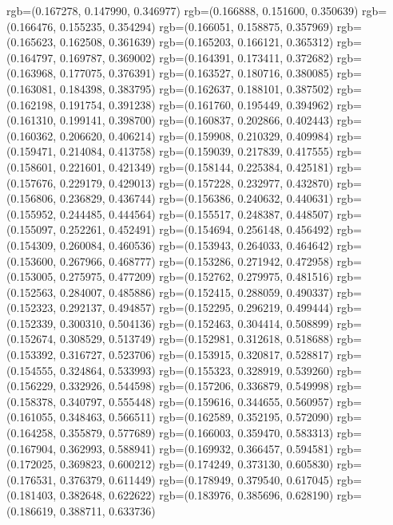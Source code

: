 {{{					rgb=(0.167278, 0.147990, 0.346977)
					rgb=(0.166888, 0.151600, 0.350639)
					rgb=(0.166476, 0.155235, 0.354294)
					rgb=(0.166051, 0.158875, 0.357969)
					rgb=(0.165623, 0.162508, 0.361639)
					rgb=(0.165203, 0.166121, 0.365312)
					rgb=(0.164797, 0.169787, 0.369002)
					rgb=(0.164391, 0.173411, 0.372682)
					rgb=(0.163968, 0.177075, 0.376391)
					rgb=(0.163527, 0.180716, 0.380085)
					rgb=(0.163081, 0.184398, 0.383795)
					rgb=(0.162637, 0.188101, 0.387502)
					rgb=(0.162198, 0.191754, 0.391238)
					rgb=(0.161760, 0.195449, 0.394962)
					rgb=(0.161310, 0.199141, 0.398700)
					rgb=(0.160837, 0.202866, 0.402443)
					rgb=(0.160362, 0.206620, 0.406214)
					rgb=(0.159908, 0.210329, 0.409984)
					rgb=(0.159471, 0.214084, 0.413758)
					rgb=(0.159039, 0.217839, 0.417555)
					rgb=(0.158601, 0.221601, 0.421349)
					rgb=(0.158144, 0.225384, 0.425181)
					rgb=(0.157676, 0.229179, 0.429013)
					rgb=(0.157228, 0.232977, 0.432870)
					rgb=(0.156806, 0.236829, 0.436744)
					rgb=(0.156386, 0.240632, 0.440631)
					rgb=(0.155952, 0.244485, 0.444564)
					rgb=(0.155517, 0.248387, 0.448507)
					rgb=(0.155097, 0.252261, 0.452491)
					rgb=(0.154694, 0.256148, 0.456492)
					rgb=(0.154309, 0.260084, 0.460536)
					rgb=(0.153943, 0.264033, 0.464642)
					rgb=(0.153600, 0.267966, 0.468777)
					rgb=(0.153286, 0.271942, 0.472958)
					rgb=(0.153005, 0.275975, 0.477209)
					rgb=(0.152762, 0.279975, 0.481516)
					rgb=(0.152563, 0.284007, 0.485886)
					rgb=(0.152415, 0.288059, 0.490337)
					rgb=(0.152323, 0.292137, 0.494857)
					rgb=(0.152295, 0.296219, 0.499444)
					rgb=(0.152339, 0.300310, 0.504136)
					rgb=(0.152463, 0.304414, 0.508899)
					rgb=(0.152674, 0.308529, 0.513749)
					rgb=(0.152981, 0.312618, 0.518688)
					rgb=(0.153392, 0.316727, 0.523706)
					rgb=(0.153915, 0.320817, 0.528817)
					rgb=(0.154555, 0.324864, 0.533993)
					rgb=(0.155323, 0.328919, 0.539260)
					rgb=(0.156229, 0.332926, 0.544598)
					rgb=(0.157206, 0.336879, 0.549998)
					rgb=(0.158378, 0.340797, 0.555448)
					rgb=(0.159616, 0.344655, 0.560957)
					rgb=(0.161055, 0.348463, 0.566511)
					rgb=(0.162589, 0.352195, 0.572090)
					rgb=(0.164258, 0.355879, 0.577689)
					rgb=(0.166003, 0.359470, 0.583313)
					rgb=(0.167904, 0.362993, 0.588941)
					rgb=(0.169932, 0.366457, 0.594581)
					rgb=(0.172025, 0.369823, 0.600212)
					rgb=(0.174249, 0.373130, 0.605830)
					rgb=(0.176531, 0.376379, 0.611449)
					rgb=(0.178949, 0.379540, 0.617045)
					rgb=(0.181403, 0.382648, 0.622622)
					rgb=(0.183976, 0.385696, 0.628190)
					rgb=(0.186619, 0.388711, 0.633736)
}}}
